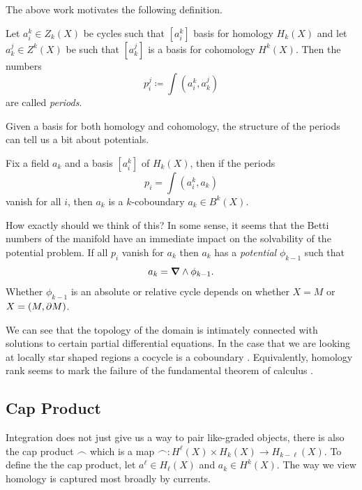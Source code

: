 \documentclass{article}
\begin{document}
The above work motivates the following definition. 
\begin{definition}
Let $a_i^k \in Z_k(X)$ be cycles such that $[a_i^k]$ basis for homology $H_k(X)$ and let $a_k^j \in Z^k(X)$ be such that $[a_k^j]$ is a basis for cohomology $H^k(X)$. Then the numbers
\begin{equation}
    p_i^j \coloneqq \int (a_i^k,a_k^j)
\end{equation}
are called \emph{periods}. 
\end{definition}

Given a basis for both homology and cohomology, the structure of the periods can tell us a bit about potentials.
\begin{proposition}
\label{prop:periods}
    Fix a field $a_k$ and a basis $[a_i^k]$ of $H_k(X)$, then if the periods 
    \begin{equation}
        p_i = \int (a_i^k,a_k)
    \end{equation}
    vanish for all $i$, then $a_k$ is a $k$-coboundary $a_k \in B^k(X)$.
\end{proposition}
How exactly should we think of this? In some sense, it seems that the Betti numbers of the manifold have an immediate impact on the solvability of the potential problem. If all $p_i$ vanish for $a_k$ then $a_k$ has a \emph{potential} $\phi_{k-1}$ such that
\begin{equation}
    a_k = \boldsymbol{\nabla} \wedge \phi_{k-1}.
\end{equation}
Whether $\phi_{k-1}$ is an absolute or relative cycle depends on whether $X=M$ or $X=(M,{\partial M})$.

We can see that the topology of the domain is intimately connected with solutions to certain partial differential equations. In the case that we are looking at locally star shaped regions a cocycle is a coboundary \cite[Proposition 5]{giaquinta_cartesian_1998}. Equivalently, homology rank seems to mark the failure of the fundamental theorem of calculus . 

\subsection{Cap Product}

Integration does not just give us a way to pair like-graded objects, there is also the cap product $\frown$ which is a map $\frown \colon H^\ell(X) \times H_k(X) \to H_{k-\ell}(X)$. To define the the cap product, let $a^\ell \in H_\ell(X)$ and $a_k \in H^k(X)$. The way we view homology is captured most broadly by currents. 
\end{document}
